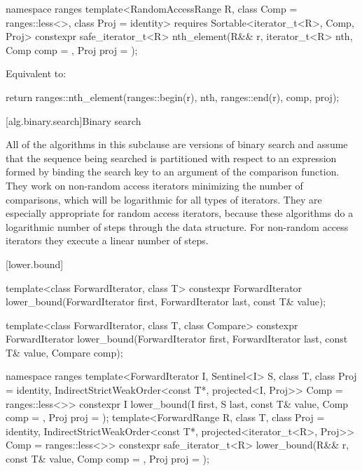 \begin{itemdecl}
namespace ranges {
  template<RandomAccessRange R, class Comp = ranges::less<>, class Proj = identity>
    requires Sortable<iterator_t<R>, Comp, Proj>
    constexpr safe_iterator_t<R>
      nth_element(R&& r, iterator_t<R> nth, Comp comp = {}, Proj proj = {});
}
\end{itemdecl}

\begin{itemdescr}
\pnum
\effects Equivalent to:
\begin{codeblock}
return ranges::nth_element(ranges::begin(r), nth, ranges::end(r), comp, proj);
\end{codeblock}
\end{itemdescr}

[alg.binary.search]{Binary search}

\pnum
All of the algorithms in this subclause are versions of binary search
and assume that the sequence being searched is partitioned with respect to
an expression formed by binding the search key to an argument of the
comparison function.
They work on non-random access iterators minimizing the number of comparisons,
which will be logarithmic for all types of iterators.
They are especially appropriate for random access iterators,
because these algorithms do a logarithmic number of steps
through the data structure.
For non-random access iterators they execute a linear number of steps.

[lower.bound]{}

%
\begin{itemdecl}
template<class ForwardIterator, class T>
  constexpr ForwardIterator
    lower_bound(ForwardIterator first, ForwardIterator last,
                const T& value);

template<class ForwardIterator, class T, class Compare>
  constexpr ForwardIterator
    lower_bound(ForwardIterator first, ForwardIterator last,
                const T& value, Compare comp);

namespace ranges {
  template<ForwardIterator I, Sentinel<I> S, class T, class Proj = identity,
      IndirectStrictWeakOrder<const T*, projected<I, Proj>> Comp = ranges::less<>>
    constexpr I lower_bound(I first, S last, const T& value, Comp comp = {},
                            Proj proj = {});
  template<ForwardRange R, class T, class Proj = identity,
      IndirectStrictWeakOrder<const T*, projected<iterator_t<R>, Proj>> Comp = ranges::less<>>
    constexpr safe_iterator_t<R>
      lower_bound(R&& r, const T& value, Comp comp = {}, Proj proj = {});
}
\end{itemdecl}

